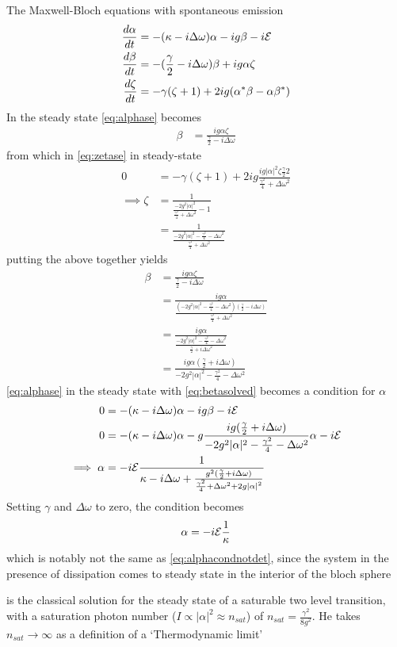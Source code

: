 The Maxwell-Bloch equations with spontaneous emission
\begin{align}
\frac{d \alpha}{dt} &= -(\kappa - i \Delta \omega)\alpha - ig \beta - i\mathcal{E}\label{eq:alphase}\\
\frac{d \beta}{dt} &= -(\frac{\gamma}{2}-i\Delta\omega)\beta+ig\alpha\zeta \label{eq:betase}\\
\frac{d\zeta}{dt} &= -\gamma (\zeta +1)+2ig(\alpha^*\beta-\alpha\beta^*) \label{eq:zetase}
\end{align}
In the steady state \cref{eq:alphase} becomes
\begin{align}
  \beta &= \frac{ig\alpha\zeta}{\frac{\gamma}{2}-i\Delta\omega}
\end{align}
from which in \cref{eq:zetase} in steady-state
\begin{align}
  0 &= -\gamma(\zeta+1)+2ig\frac{ig|\alpha|^2\zeta\frac{\gamma}{2}2}{\frac{\gamma^2}{4}+\Delta\omega^2} \\
  \implies \zeta &= \frac{1}{\frac{-2g^2|\alpha|^2}{\frac{\gamma^2}{4} +\Delta\omega^2}-1} \\
  &= \frac{1}{\frac{-2g^2|\alpha|^2 - \frac{\gamma^2}{4}-\Delta\omega^2}{\frac{\gamma^2}{4} +\Delta\omega^2}}
\end{align}
putting the above together yields
\begin{align}
  \beta &= \frac{ig\alpha\zeta}{\frac{\gamma}{2}-i\Delta\omega}\\
  &= \frac{ig\alpha}{\frac{(-2g^2|\alpha|^2-\frac{\gamma^2}{4}-\Delta\omega^2)(\frac{\gamma}{2}-i\Delta\omega)}{\frac{\gamma^2}{4}+\Delta\omega^2}}\\
  &= \frac{ig\alpha}{\frac{-2g^2|\alpha|^2-\frac{\gamma^2}{4}-\Delta\omega^2}{\frac{\gamma}{2}+i\Delta\omega^2}}\\
  &= \frac{ig\alpha(\frac{\gamma}{2}+i\Delta\omega)}{-2g^2|\alpha|^2-\frac{\gamma^2}{4}-\Delta\omega^2} \label{eq:betasolved}
\end{align}
\cref{eq:alphase} in the steady state with  \cref{eq:betasolved} becomes a condition for $\alpha$
\begin{align} %
0&=-(\kappa-i\Delta\omega)\alpha-ig\beta-i\Epsilon \\
0&=-{(\kappa-i\Delta\omega)}\alpha-g\frac{ig(\frac{\gamma}{2}+i\Delta\omega)}{-2g^2|\alpha|^2-\frac{\gamma^2}{4}-\Delta\omega^2}\alpha-i\Epsilon \\
\implies \alpha &= -i\Epsilon \frac{1}{\kappa-i\Delta\omega+\frac{g^2(\frac{\gamma}{2}+i\Delta\omega)}{\frac{\gamma^2}{4}+{\Delta\omega}^2+2g{|\alpha|}^2}}\label{eq:alphadetdiss}
\end{align}
Setting $\gamma$ and $\Delta\omega$ to zero, the condition becomes
\begin{equation}
  \alpha = -i\mathcal{E}\frac{1}{\kappa}
\end{equation}
which is notably not the same as \cref{eq:alphacondnotdet}, since the system in the presence of dissipation comes to steady state in the interior of the bloch sphere

 is the classical solution for the steady state of a saturable two level transition, with a saturation photon number ($I \propto |\alpha|^2 \approx n_{sat}$) of $n_{sat} = \frac{\gamma^2}{8g^2}$. He takes $n_{sat} \rightarrow \infty$ as a definition of a `Thermodynamic limit'
